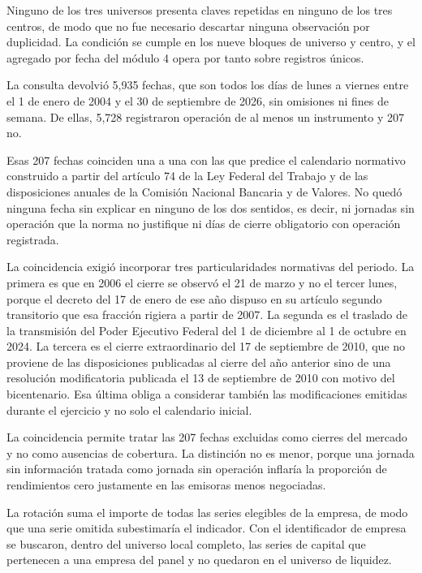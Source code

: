 Ninguno de los tres universos presenta claves repetidas en ninguno de los tres centros, de modo que no fue necesario descartar ninguna observación por duplicidad. La condición se cumple en los nueve bloques de universo y centro, y el agregado por fecha del módulo 4 opera por tanto sobre registros únicos.


La consulta devolvió 5,935 fechas, que son todos los días de lunes a viernes entre el 1 de enero de 2004 y el 30 de septiembre de 2026, sin omisiones ni fines de semana. De ellas, 5,728 registraron operación de al menos un instrumento y 207 no.

Esas 207 fechas coinciden una a una con las que predice el calendario normativo construido a partir del artículo 74 de la Ley Federal del Trabajo y de las disposiciones anuales de la Comisión Nacional Bancaria y de Valores. No quedó ninguna fecha sin explicar en ninguno de los dos sentidos, es decir, ni jornadas sin operación que la norma no justifique ni días de cierre obligatorio con operación registrada.

La coincidencia exigió incorporar tres particularidades normativas del periodo. La primera es que en 2006 el cierre se observó el 21 de marzo y no el tercer lunes, porque el decreto del 17 de enero de ese año dispuso en su artículo segundo transitorio que esa fracción rigiera a partir de 2007. La segunda es el traslado de la transmisión del Poder Ejecutivo Federal del 1 de diciembre al 1 de octubre en 2024. La tercera es el cierre extraordinario del 17 de septiembre de 2010, que no proviene de las disposiciones publicadas al cierre del año anterior sino de una resolución modificatoria publicada el 13 de septiembre de 2010 con motivo del bicentenario. Esa última obliga a considerar también las modificaciones emitidas durante el ejercicio y no solo el calendario inicial.

La coincidencia permite tratar las 207 fechas excluidas como cierres del mercado y no como ausencias de cobertura. La distinción no es menor, porque una jornada sin información tratada como jornada sin operación inflaría la proporción de rendimientos cero justamente en las emisoras menos negociadas.


La rotación suma el importe de todas las series elegibles de la empresa, de modo que una serie omitida subestimaría el indicador. Con el identificador de empresa se buscaron, dentro del universo local completo, las series de capital que pertenecen a una empresa del panel y no quedaron en el universo de liquidez.

